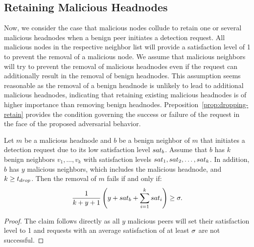 \subsection{Retaining Malicious Headnodes}
Now, we consider the case that malicious nodes collude to retain one or several malicious headnodes when a benign peer initiates a detection request. 
All malicious nodes in the respective neighbor list will provide a satisfaction level of 1 to prevent the removal of a malicious node. We assume that malicious neighbors will try to prevent the removal of malicious headnodes even if the request can additionally result in the removal of benign headnodes. This assumption seems reasonable as the removal of a benign headnode is unlikely to lead to additional malicious headnodes, indicating that retaining existing malicious headnodes is of higher importance than removing benign headnodes.  Preposition~\ref{prop:dropping-retain} provides the condition governing the success or failure of the \drop request in the face of the proposed adversarial behavior. 

\begin{proposition}
\label{prop:dropping-retain}
Let $m$ be a malicious headnode and $b$ be a benign neighbor of $m$ that initiates a detection request due to its low satisfaction level $sat_b$.
Assume that $b$ has $k$ benign neighbors $v_1, \ldots , v_k$ with satisfaction levels $sat_1, sat_2 ,\ldots  , sat_k$. In addition, $b$ has $y$ malicious neighbors, which includes the malicious headnode, and $k\geq t_{drop}$.
 Then the removal of $m$ fails if and only if: 
\begin{align}
\label{eq:drop-retain}
\frac{1}{k+y+1}\left(y+\sat_b + \sum_{i=1}^k \sat_i\right) \geq \satThres.  
\end{align} 
\end{proposition}
\begin{proof}
The claim follows directly as all $y$ malicious peers will set their satisfaction level to 1 and \drop requests with an average satisfaction of at least $\sigma$ are not successful.   
\end{proof}


 

